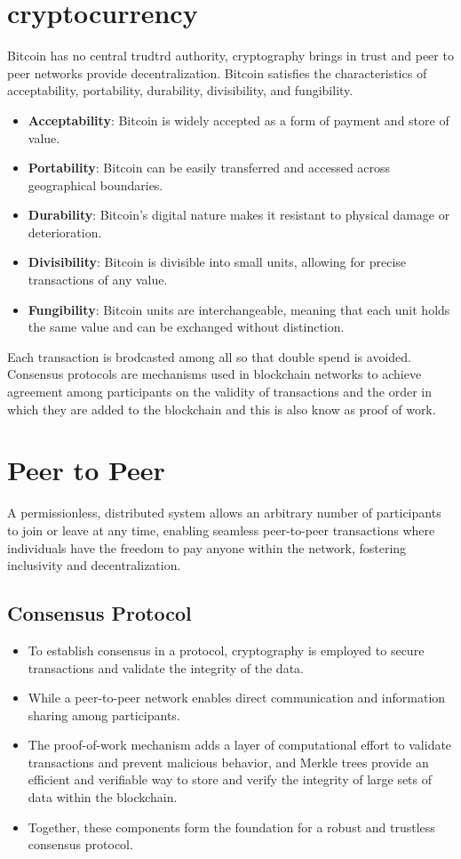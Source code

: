 \documentclass{article}
\begin{document}
\section{cryptocurrency}
Bitcoin has no central trudtrd authority, cryptography brings in trust and peer to peer networks provide decentralization. Bitcoin satisfies the characteristics of acceptability, portability, durability, divisibility, and fungibility.
\begin{itemize}
\item \textbf{Acceptability}: Bitcoin is widely accepted as a form of payment and store of value.
\item \textbf{Portability}: Bitcoin can be easily transferred and accessed across geographical boundaries.
\item \textbf{Durability}: Bitcoin's digital nature makes it resistant to physical damage or deterioration.
\item \textbf{Divisibility}: Bitcoin is divisible into small units, allowing for precise transactions of any value.
\item \textbf{Fungibility}: Bitcoin units are interchangeable, meaning that each unit holds the same value and can be exchanged without distinction.
\end{itemize}
Each transaction is brodcasted among all so that double spend is avoided. \\
Consensus protocols are mechanisms used in blockchain networks to achieve agreement among participants on the validity of transactions and the order in which they are added to the blockchain and this is also know as proof of work.
\section{Peer to Peer}
A permissionless, distributed system allows an arbitrary number of participants to join or leave at any time, enabling seamless peer-to-peer transactions where individuals have the freedom to pay anyone within the network, fostering inclusivity and decentralization.
\subsection{Consensus Protocol}
\begin{itemize}
\item To establish consensus in a protocol, cryptography is employed to secure transactions and validate the integrity of the data. 
\item While a peer-to-peer network enables direct communication and information sharing among participants. 
\item The proof-of-work mechanism adds a layer of computational effort to validate transactions and prevent malicious behavior, and Merkle trees provide an efficient and verifiable way to store and verify the integrity of large sets of data within the blockchain. 
\item Together, these components form the foundation for a robust and trustless consensus protocol.
\end{itemize}
\end{document}
